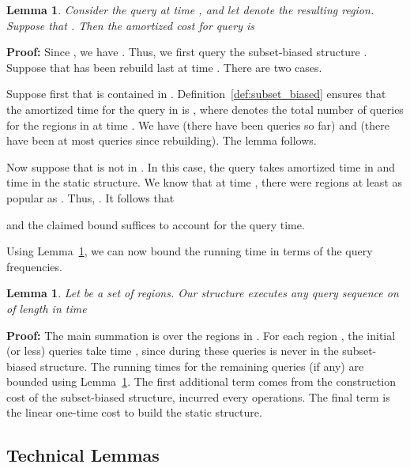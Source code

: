 \documentclass[11pt]{article}
\newtheorem{lemma}[figure]{Lemma}
\newenvironment{proof}{\noindent\textbf{Proof: }\ignorespaces}
  {\hspace*{\fill}\medskip}
\begin{document}
\begin{lemma} \label{singlequery} 
Consider the query  at time , and let  denote the 
resulting region.
Suppose that  . 
Then the amortized cost for query  is
 
\end{lemma}

\begin{proof} 
Since , we have . Thus,
we first query the subset-biased structure .
Suppose that  has been rebuild last at time . 
There are two cases. 

Suppose first that  is
contained in .  Definition~\ref{def:subset_biased}
ensures that the amortized time for the query in  is 
, where  denotes the total number 
of queries for the regions in  at time
.
We have  (there have been  queries so far) and 
 (there have been at most 
queries since rebuilding). The lemma follows.

Now suppose that  is not in . In this case, the query 
takes  amortized time in  and  time in the
static structure. 
We know that at time , there were   regions 
at least as popular as . Thus, . 
It follows that 

and the claimed bound 
suffices to account for the
 query time.
\end{proof}

\noindent
Using Lemma~\ref{singlequery}, we can now bound the running time
in terms of the query frequencies. 

\begin{lemma} \label{bigruntime} 
Let  be a set of  regions. Our structure executes any query sequence 
 on  of length  in time

\end{lemma}


\begin{proof} 
The main summation is over the regions in . For each
region , the initial  (or less) queries take 
time , since during these queries  is never in 
the subset-biased structure. The running times for the 
remaining queries (if any) are 
bounded using Lemma~\ref{singlequery}. The first additional term 
comes from the  construction cost of the 
subset-biased structure, incurred every  operations. 
The final term is the
linear one-time cost to build the static structure.
\end{proof}

\subsection{Technical Lemmas}
\end{document}
